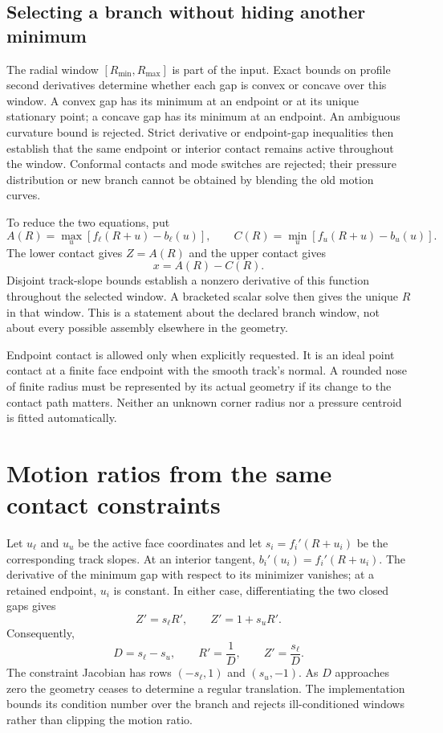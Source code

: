 \documentclass[11pt,letterpaper]{article}
\numberwithin{equation}{section}
\begin{document}
\subsection{Selecting a branch without hiding another minimum}

The radial window $[R_{\min},R_{\max}]$ is part of the input. Exact bounds on
profile second derivatives determine whether each gap is convex or concave
over this window. A convex gap has its minimum at an endpoint or at its unique
stationary point; a concave gap has its minimum at an endpoint. An ambiguous
curvature bound is rejected. Strict derivative or endpoint-gap inequalities
then establish that the same endpoint or interior contact remains active
throughout the window. Conformal contacts and mode switches are rejected;
their pressure distribution or new branch cannot be obtained by blending the
old motion curves.

To reduce the two equations, put
\begin{equation}
 A(R)=\max_u[f_\ell(R+u)-b_\ell(u)],\qquad
 C(R)=\min_u[f_u(R+u)-b_u(u)].
\end{equation}
The lower contact gives $Z=A(R)$ and the upper contact gives
\begin{equation}
 x=A(R)-C(R).
 \label{eq:inverse}
\end{equation}
Disjoint track-slope bounds establish a nonzero derivative of this function
throughout the selected window. A bracketed scalar solve then gives the unique
$R$ in that window. This is a statement about the declared branch window, not
about every possible assembly elsewhere in the geometry.

Endpoint contact is allowed only when explicitly requested. It is an ideal
point contact at a finite face endpoint with the smooth track's normal.
A rounded nose of finite radius must be represented by its actual geometry
if its change to the contact path matters. Neither an unknown corner radius
nor a pressure centroid is fitted automatically.

\section{Motion ratios from the same contact constraints}

Let $u_\ell$ and $u_u$ be the active face coordinates and let
$s_i=f_i'(R+u_i)$ be the corresponding track slopes. At an interior tangent,
$b_i'(u_i)=f_i'(R+u_i)$. The derivative of the minimum gap with respect to its
minimizer vanishes; at a retained endpoint, $u_i$ is constant. In either case,
differentiating the two closed gaps gives
\begin{equation}
 Z'=s_\ell R',\qquad Z'=1+s_u R'.
\end{equation}
Consequently,
\begin{equation}
 D=s_\ell-s_u,\qquad R'=\frac1D,\qquad Z'=\frac{s_\ell}{D}.
 \label{eq:first}
\end{equation}
The constraint Jacobian has rows $(-s_\ell,1)$ and $(s_u,-1)$.
As $D$ approaches zero the geometry ceases to determine a regular translation.
The implementation bounds its condition number over the branch and rejects
ill-conditioned windows rather than clipping the motion ratio.
\end{document}

